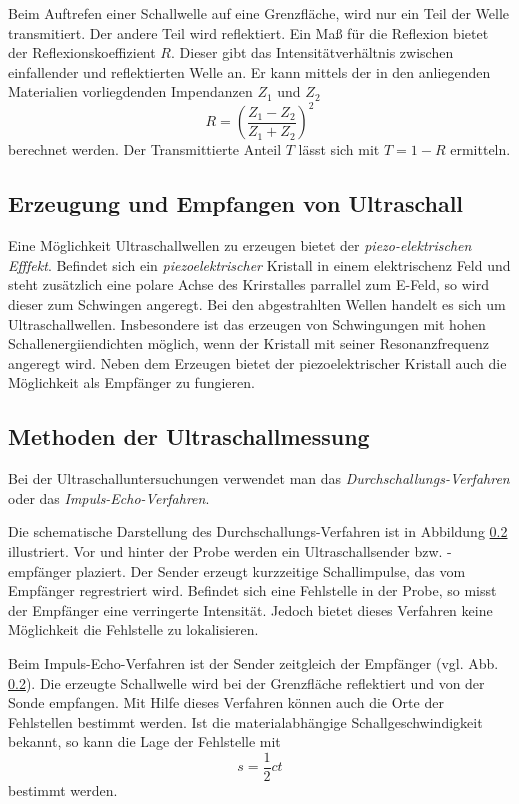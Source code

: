 Beim Auftrefen einer Schallwelle auf eine Grenzfläche, wird nur ein Teil der
Welle transmitiert. Der andere Teil wird reflektiert.
Ein Maß für die Reflexion bietet der Reflexionskoeffizient $R$.
Dieser gibt das Intensitätverhältnis zwischen einfallender und reflektierten Welle an.
Er kann mittels der in den anliegenden Materialien vorliegdenden Impendanzen $Z_1$ und $Z_2$
\begin{equation*}
  R=\left(\frac{Z_1-Z_2}{Z_1+Z_2}\right)^2
\end{equation*}
berechnet werden.
Der Transmittierte Anteil $T$ lässt sich mit $T=1-R$ ermitteln.

\subsection{Erzeugung und Empfangen von Ultraschall}

Eine Möglichkeit Ultraschallwellen zu erzeugen bietet der \emph{piezo-elektrischen Efffekt}.
Befindet sich ein \emph{piezoelektrischer} Kristall in einem elektrischenz Feld und steht
zusätzlich eine polare Achse des Krirstalles parrallel zum E-Feld, so wird dieser
zum Schwingen angeregt. Bei den abgestrahlten Wellen handelt es sich um Ultraschallwellen.
Insbesondere ist das erzeugen von Schwingungen mit hohen Schallenergiiendichten möglich,
wenn der Kristall mit seiner Resonanzfrequenz angeregt wird.
Neben dem Erzeugen bietet der piezoelektrischer Kristall auch die Möglichkeit
als Empfänger zu fungieren.

\subsection{Methoden der Ultraschallmessung}
Bei der Ultraschalluntersuchungen verwendet man das \emph{Durchschallungs-Verfahren} oder
das \emph{Impuls-Echo-Verfahren}.

Die schematische Darstellung des Durchschallungs-Verfahren ist in Abbildung
\ref{} illustriert. Vor und hinter der Probe werden ein Ultraschallsender bzw. -empfänger
plaziert. Der Sender erzeugt kurzzeitige Schallimpulse, das vom Empfänger
regrestriert wird. Befindet sich eine Fehlstelle in der Probe, so misst der Empfänger
eine verringerte Intensität. Jedoch bietet dieses Verfahren keine Möglichkeit die
Fehlstelle zu lokalisieren.

Beim Impuls-Echo-Verfahren ist der Sender zeitgleich der Empfänger (vgl. Abb. \ref{}).
Die erzeugte Schallwelle wird bei der Grenzfläche reflektiert und von der Sonde
empfangen. Mit Hilfe dieses Verfahren können auch die Orte der Fehlstellen bestimmt
werden. Ist die materialabhängige Schallgeschwindigkeit bekannt, so kann die
Lage der Fehlstelle mit
\begin{equation}
  \label{eq:lage_fehl}
  s=\frac{1}{2}ct
\end{equation}
bestimmt werden.

